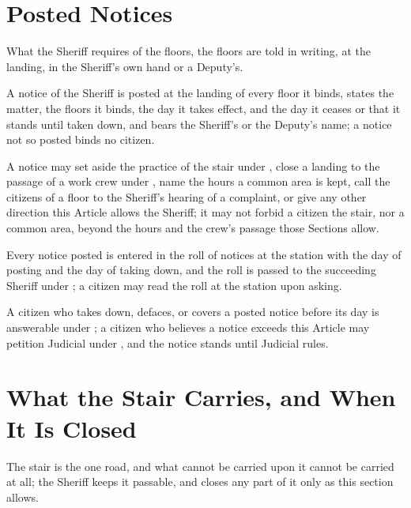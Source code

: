 \section{Posted Notices}
\label{sec:sheriff:posted-notices}

What the Sheriff requires of the floors, the floors are told in writing, at the landing, in the Sheriff's own hand or a Deputy's.

\begin{clauses}
\item A notice of the Sheriff is posted at the landing of every floor it binds, states the matter, the floors it binds, the day it takes effect, and the day it ceases or that it stands until taken down, and bears the Sheriff's or the Deputy's name; a notice not so posted binds no citizen.
\item A notice may set aside the practice of the stair under , close a landing to the passage of a work crew under , name the hours a common area is kept, call the citizens of a floor to the Sheriff's hearing of a complaint, or give any other direction this Article allows the Sheriff; it may not forbid a citizen the stair, nor a common area, beyond the hours and the crew's passage those Sections allow.
\item Every notice posted is entered in the roll of notices at the station with the day of posting and the day of taking down, and the roll is passed to the succeeding Sheriff under ; a citizen may read the roll at the station upon asking.
\item A citizen who takes down, defaces, or covers a posted notice before its day is answerable under ; a citizen who believes a notice exceeds this Article may petition Judicial under , and the notice stands until Judicial rules.
\end{clauses}

\section{What the Stair Carries, and When It Is Closed}
\label{sec:sheriff:carrying-and-closing-of-the-stair}

The stair is the one road, and what cannot be carried upon it cannot be carried at all; the Sheriff keeps it passable, and closes any part of it only as this section allows.

